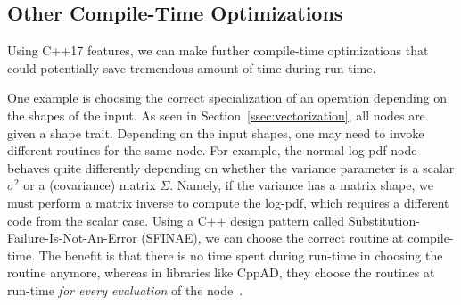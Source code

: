 \subsection{Other Compile-Time Optimizations}\label{ssec:compile-time-opt}

Using C++17 features, we can make further compile-time optimizations
that could potentially save tremendous amount of time during run-time.


One example is choosing the correct specialization of an operation
depending on the shapes of the input.
As seen in Section~\ref{ssec:vectorization}, all nodes are given a shape trait.
Depending on the input shapes, one may need to invoke different routines for the same node.
For example, the normal log-pdf node behaves quite differently
depending on whether the variance parameter is a scalar $\sigma^2$
or a (covariance) matrix $\Sigma$.
Namely, if the variance has a matrix shape,
we must perform a matrix inverse to compute the log-pdf,
which requires a different code from the scalar case.
Using a C++ design pattern called Substitution-Failure-Is-Not-An-Error (SFINAE),
we can choose the correct routine at compile-time.
The benefit is that there is no time spent during run-time in choosing the routine anymore,
whereas in libraries like CppAD, they choose the routines at run-time 
\emph{for every evaluation} of the node~\cite{bell:2020}.


